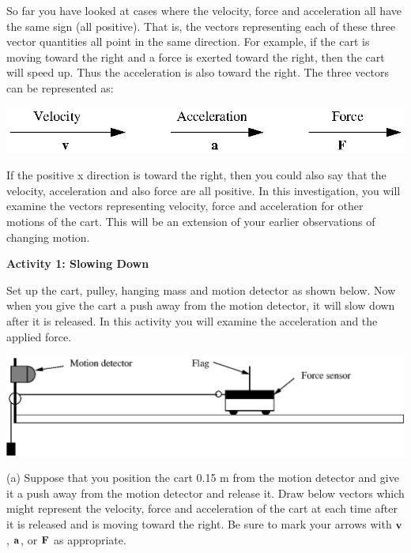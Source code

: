 So far you have looked at cases where the velocity, force and acceleration all
have the same sign (all positive). That is, the vectors representing each of
these three vector quantities all point in the same direction. For example,
if the cart is moving toward the right and a force is exerted toward the right,
then the cart will speed up. Thus the acceleration is also toward the right.
The three vectors can be represented as:

\vspace{0.3cm}
{\par\centering \includegraphics{force2/force2_fig1.eps} \par}
\vspace{0.3cm}

If the positive x direction is toward the right, then you could also say that
the velocity, acceleration and also force are all positive. In this investigation,
you will examine the vectors representing velocity, force and acceleration for
other motions of the cart. This will be an extension of your earlier observations
of changing motion.

\textbf{Activity 1: Slowing Down} 

Set up the cart, pulley, hanging mass and motion detector as shown below. Now
when you give the cart a push away from the motion detector, it will slow down
after it is released. In this activity you will examine the acceleration and
the applied force.

\vspace{0.3cm}
{\par\centering \includegraphics{force2/force2_fig2.eps} \par}
\vspace{0.3cm}

(a) Suppose that you position the cart 0.15 m from the motion detector and give
it a push away from the motion detector and release it. Draw below vectors which
might represent the velocity, force and acceleration of the cart at each time
after it is released and is moving toward the right. Be sure to mark your arrows
with \( {\bf v} \), \( {\bf a} \), or \( {\bf F} \)
as appropriate.

